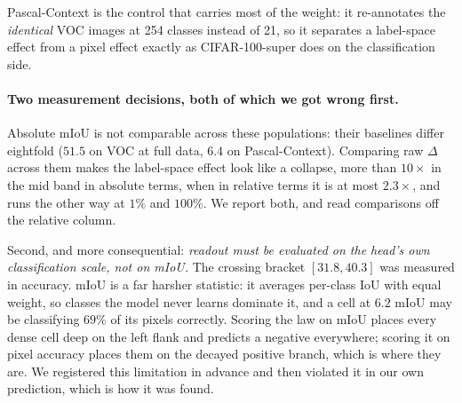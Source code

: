Pascal-Context is the control that carries most of the weight: it re-annotates
the \emph{identical} VOC images at 254 classes instead of 21, so it separates a
label-space effect from a pixel effect exactly as CIFAR-100-super does on the
classification side.

\paragraph{Two measurement decisions, both of which we got wrong first.}
Absolute mIoU is not comparable across these populations: their baselines
differ eightfold ($51.5$ on VOC at full data, $6.4$ on Pascal-Context).
Comparing raw $\Delta$ across them makes the label-space effect look like a
collapse, more than $10\times$ in the mid band in absolute terms, when in
relative terms it is at most $2.3\times$, and runs
the other way at $1\%$ and $100\%$. We report both, and read comparisons off
the relative column.

Second, and more consequential: \emph{readout must be evaluated on the head's
own classification scale, not on mIoU.} The crossing bracket $[31.8, 40.3]$ was
measured in accuracy. mIoU is a far harsher statistic: it averages per-class
IoU with equal weight, so classes the model never learns dominate it, and a
cell at $6.2$ mIoU may be classifying $69\%$ of its pixels correctly. Scoring
the law on mIoU places every dense cell deep on the left flank and predicts a
negative \readout{} everywhere; scoring it on pixel accuracy places them on the
decayed positive branch, which is where they are. We registered this limitation
in advance and then violated it in our own prediction, which is how it was
found.

